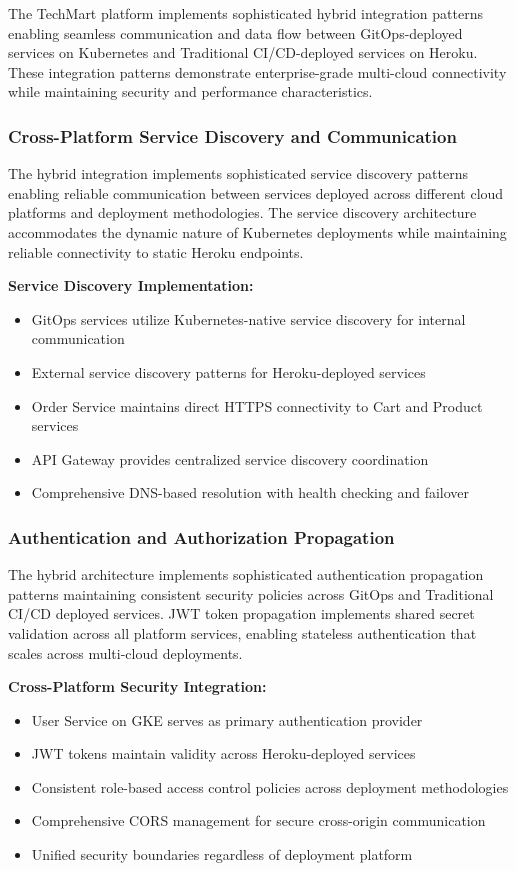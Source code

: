 The TechMart platform implements sophisticated hybrid integration patterns enabling seamless communication and data flow between GitOps-deployed services on Kubernetes and Traditional CI/CD-deployed services on Heroku. These integration patterns demonstrate enterprise-grade multi-cloud connectivity while maintaining security and performance characteristics.

\subsubsection{Cross-Platform Service Discovery and Communication}

The hybrid integration implements sophisticated service discovery patterns enabling reliable communication between services deployed across different cloud platforms and deployment methodologies. The service discovery architecture accommodates the dynamic nature of Kubernetes deployments while maintaining reliable connectivity to static Heroku endpoints.

\textbf{Service Discovery Implementation:}
\begin{itemize}
\item GitOps services utilize Kubernetes-native service discovery for internal communication
\item External service discovery patterns for Heroku-deployed services
\item Order Service maintains direct HTTPS connectivity to Cart and Product services
\item API Gateway provides centralized service discovery coordination
\item Comprehensive DNS-based resolution with health checking and failover
\end{itemize}

\subsubsection{Authentication and Authorization Propagation}

The hybrid architecture implements sophisticated authentication propagation patterns maintaining consistent security policies across GitOps and Traditional CI/CD deployed services. JWT token propagation implements shared secret validation across all platform services, enabling stateless authentication that scales across multi-cloud deployments.

\textbf{Cross-Platform Security Integration:}
\begin{itemize}
\item User Service on GKE serves as primary authentication provider
\item JWT tokens maintain validity across Heroku-deployed services
\item Consistent role-based access control policies across deployment methodologies
\item Comprehensive CORS management for secure cross-origin communication
\item Unified security boundaries regardless of deployment platform
\end{itemize}

